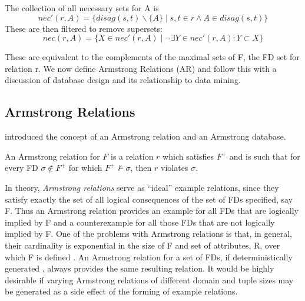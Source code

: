 \begin{definition}
\begin{rm}
The collection of all necessary sets for A is
\begin{displaymath}
nec'(r, A) = \{ disag(s,t) \backslash \{ A \} \mid s,t \in r \wedge A \in
 disag(s, t) \}
\end{displaymath}
These are then filtered to remove supersets:
\begin{displaymath}
nec(r , A) = \{ X \in nec'(r, A) \mid \neg\exists Y \in nec'(r,A): Y \subset X \}
\end{displaymath}
\end{rm}
\end{definition}

These are equivalent to the complements of the maximal sets of F, the FD
set for relation r.  We now define  Armstrong Relations (AR) and
follow this with a discussion of database design and its relationship
to data mining.

\subsection{Armstrong Relations}


\cite{Arms74} introduced the concept of an Armstrong relation and an Armstrong 
database.  

\begin{definition}
\begin{rm}
An Armstrong relation for $F$ is a relation $r$ which satisfies $F^+$
and is such
that for every FD $\sigma \not\in F^+$ for which  $F^+ \not\models
\sigma$, then $r$ violates $\sigma$.
\end{rm}
\end{definition}

In theory, {\em Armstrong relations} \cite{fag82,bdfs84,dt95,gl90,lev95,mr86}
serve as ``ideal'' example relations, since they satisfy exactly the set of
all logical consequences of the set of FDs specified, say F.
Thus an Armstrong relation provides an example for all FDs
that are logically implied by F and a counterexample for all 
those FDs that are not logically implied by F.
One of the problems with Armstrong relations is that, in general,
their cardinality is exponential in the size of F and set of attributes, R,
over which F is defined \cite{bdfs84}. An Armstrong relation for a
set of FDs, if
deterministically generated \cite{Mann92}, always provides
the same resulting relation. It would be highly desirable if varying Armstrong relations
of different domain and tuple sizes may be generated as a side effect of 
the forming of example relations.

